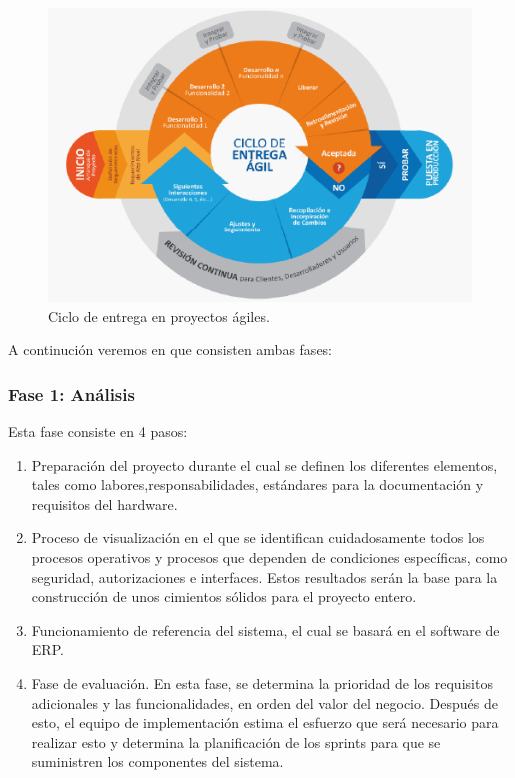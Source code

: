 \begin{figure}[h]
	\centering
	\includegraphics[width=1\textwidth]{img/metodologia-agil}
	\caption{Ciclo de entrega en proyectos ágiles.}
	\label{fig:metodologia-agil}
\end{figure}

A continución veremos en que consisten ambas fases:

\subsubsection{Fase 1: Análisis} \label{sssec:fase-analisis}
Esta fase consiste en 4 pasos:
\begin{enumerate}
	\item Preparación del proyecto durante el cual se definen los diferentes elementos, tales como labores,responsabilidades, estándares para la documentación y requisitos del hardware.
	\item Proceso de visualización en el que se identifican cuidadosamente todos los procesos operativos y procesos que dependen de condiciones específicas, como seguridad, autorizaciones e interfaces. Estos resultados serán la base para la construcción de unos cimientos sólidos para el proyecto entero.
	\item Funcionamiento de referencia del sistema, el cual se basará en el software de ERP.
	\item Fase de evaluación. En esta fase, se determina la prioridad de los requisitos adicionales y las funcionalidades, en orden del valor del negocio. Después de esto, el equipo de implementación estima el esfuerzo que será necesario para realizar esto y determina la planificación de los sprints para que se suministren los componentes del sistema.
\end{enumerate}

